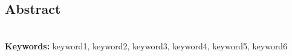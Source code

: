 \thispagestyle{plain}
\vspace*{1em}
\begin{center}
    \section*{Abstract}
\end{center}
\vspace*{1em}
\vspace*{1em}

\lipsum[4]\\
\vspace{0.5cm}
\textbf{Keywords:}  keyword1, keyword2, keyword3, keyword4, keyword5, keyword6
\newpage